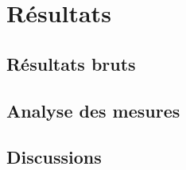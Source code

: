 

\section{Résultats}

\subsection{Résultats bruts}

\subsection{Analyse des mesures}

\subsection{Discussions}

